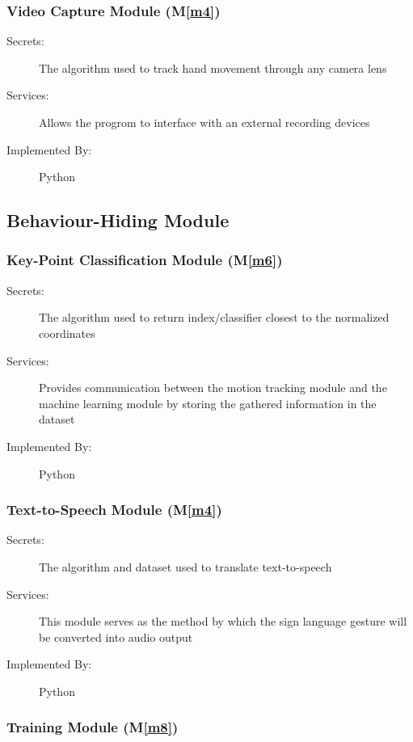 \documentclass[12pt, titlepage]{article}
\newcommand{\mref}[1]{M\ref{#1}}
\begin{document}
\subsubsection{Video Capture Module (\mref{m4})}

\begin{description}
  \item[Secrets:] The algorithm used to track hand movement through any camera lens
  \item[Services:] Allows the progrom to interface with an external recording devices
  \item[Implemented By:] Python
  \end{description}

\subsection{Behaviour-Hiding Module}

\subsubsection{Key-Point Classification Module (\mref{m6})}

\begin{description}
  \item[Secrets:] The algorithm used to return index/classifier closest to the normalized coordinates
  \item[Services:] Provides communication between the motion tracking module and the machine learning module by storing the gathered information in the dataset
  \item[Implemented By:] Python
  \end{description}

\subsubsection{Text-to-Speech Module (\mref{m4})}

\begin{description}
  \item[Secrets:] The algorithm and dataset used to translate text-to-speech
  \item[Services:] This module serves as the method by which the sign language gesture will be converted into audio output
  \item[Implemented By:] Python
  \end{description}  
  
\subsubsection{Training Module (\mref{m8})}
\end{document}
